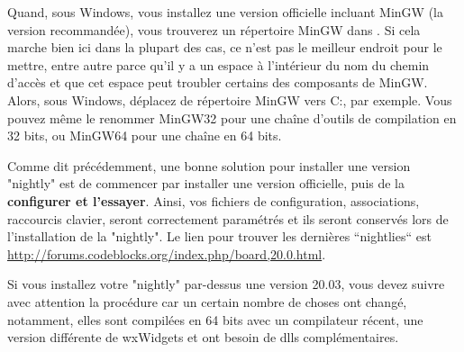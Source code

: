Quand, sous Windows, vous installez une version officielle incluant MinGW (la version recommandée), vous trouverez un répertoire MinGW dans . Si cela marche bien ici dans la plupart des cas, ce n'est pas le meilleur endroit pour le mettre, entre autre parce qu'il y a un espace à l'intérieur du nom du chemin d'accès et que cet espace peut troubler certains des composants de MinGW. Alors, sous Windows, déplacez de répertoire MinGW vers C:, par exemple. Vous pouvez même le renommer MinGW32 pour une chaîne d'outils de compilation en 32 bits, ou MinGW64 pour une chaîne en 64 bits.

Comme dit précédemment, une bonne solution pour installer une version "nightly" est de commencer par installer une version officielle, puis de la \textbf{configurer et l'essayer}. Ainsi, vos fichiers de configuration, associations, raccourcis clavier, seront correctement paramétrés et ils seront conservés lors de l'installation de la "nightly". Le lien pour trouver les dernières “nightlies“ est \url{http://forums.codeblocks.org/index.php/board,20.0.html}.

Si vous installez votre "nightly" par-dessus une version 20.03, vous devez suivre avec attention la procédure car un certain nombre de choses ont changé, notamment, elles sont compilées en 64 bits avec un compilateur récent, une version différente de wxWidgets et ont besoin de dlls complémentaires.

